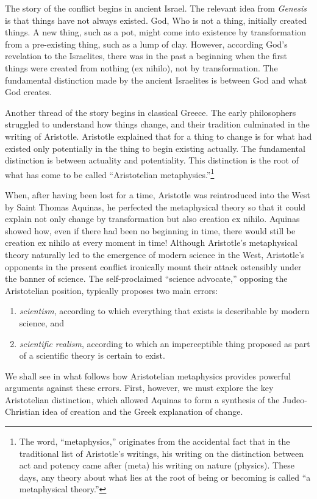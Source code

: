 \documentclass[twocolumn]{article}
\begin{document}
The story of the conflict begins in ancient Israel.  The relevant idea from
{\it Genesis} is that things have not always existed.  God, Who is not a thing,
initially created things.  A new thing, such as a pot, might come into
existence by transformation from a pre-existing thing, such as a lump of clay.
However, according God's revelation to the Israelites, there was in the past a
beginning when the first things were created from nothing (ex nihilo), not by
transformation.  The fundamental distinction made by the ancient Israelites is
between God and what God creates.

Another thread of the story begins in classical Greece.  The early philosophers
struggled to understand how things change, and their tradition culminated in
the writing of Aristotle.  Aristotle explained that for a thing to change is
for what had existed only potentially in the thing to begin existing actually.
The fundamental distinction is between actuality and potentiality.  This
distinction is the root of what has come to be called ``Aristotelian
metaphysics.''\footnote{%
   The word, ``metaphysics,'' originates from the accidental fact that in the
   traditional list of Aristotle's writings, his writing on the distinction
   between act and potency came after (meta) his writing on nature (physics).
   These days, any theory about what lies at the root of being or becoming is
   called ``a metaphysical theory.''%
}

When, after having been lost for a time, Aristotle was reintroduced into the
West by Saint Thomas Aquinas, he perfected the metaphysical theory so that it
could explain not only change by transformation but also creation ex nihilo.
Aquinas showed how, even if there had been no beginning in time, there would
still be creation ex nihilo at every moment in time!  Although Aristotle's
metaphysical theory naturally led to the emergence of modern science in the
West, Aristotle's opponents in the present conflict ironically mount their
attack ostensibly under the banner of science.  The self-proclaimed ``science
advocate,'' opposing the Aristotelian position, typically proposes two main
errors:
\begin{enumerate}
   \item \emph{scientism}, according to which everything that exists is
      describable by modern science, and
   \item \emph{scientific realism}, according to which an imperceptible thing
      proposed as part of a scientific theory is certain to exist.
\end{enumerate}
We shall see in what follows how Aristotelian metaphysics provides powerful
arguments against these errors.  First, however, we must explore the key
Aristotelian distinction, which allowed Aquinas to form a synthesis of the
Judeo-Christian idea of creation and the Greek explanation of change.
\end{document}
